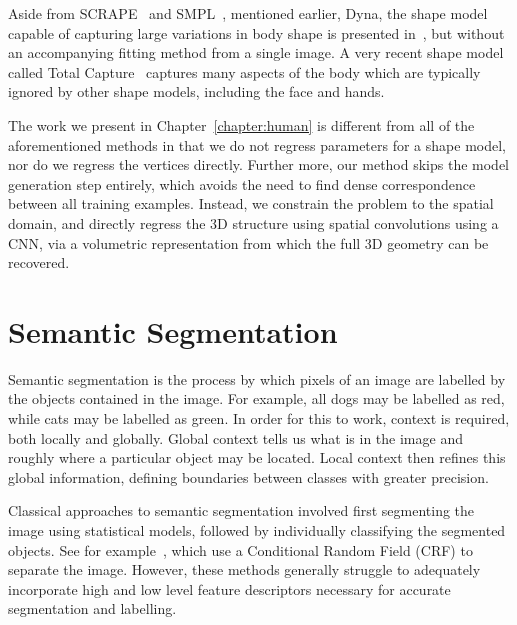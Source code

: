 Aside from SCRAPE~\cite{anguelov2005scape} and
SMPL~\cite{loper2015smpl}, mentioned earlier, Dyna, the shape model
capable of capturing large variations in body shape is presented
in~\cite{Dyna:SIGGRAPH:2015}, but without an accompanying fitting
method from a single image. A very recent shape model called Total
Capture~\cite{Joo_2018_CVPR} captures many aspects of the body which
are typically ignored by other shape models, including the face and
hands.

The work we present in Chapter~\ref{chapter:human} is different from
all of the aforementioned methods in that we do not regress parameters
for a shape model, nor do we regress the vertices directly. Further
more, our method skips the model generation step entirely, which
avoids the need to find dense correspondence between all training
examples. Instead, we constrain the problem to the spatial domain, and
directly regress the 3D structure using spatial convolutions using a
CNN, via a volumetric representation from which the full 3D geometry
can be recovered.


\section{Semantic Segmentation}

Semantic segmentation is the process by which pixels of an image are
labelled by the objects contained in the image. For example, all dogs
may be labelled as red, while cats may be labelled as green. In order
for this to work, context is required, both locally and
globally. Global context tells us what is in the image and roughly
where a particular object may be located. Local context then refines
this global information, defining boundaries between classes with
greater precision.

Classical approaches to semantic segmentation involved first
segmenting the image using statistical models, followed by
individually classifying the segmented objects. See for
example~\cite{arbelaez2012semantic,carreira2012semantic}, which use a
Conditional Random Field (CRF) to separate the image. However, these
methods generally struggle to adequately incorporate high and low
level feature descriptors necessary for accurate segmentation and
labelling.

